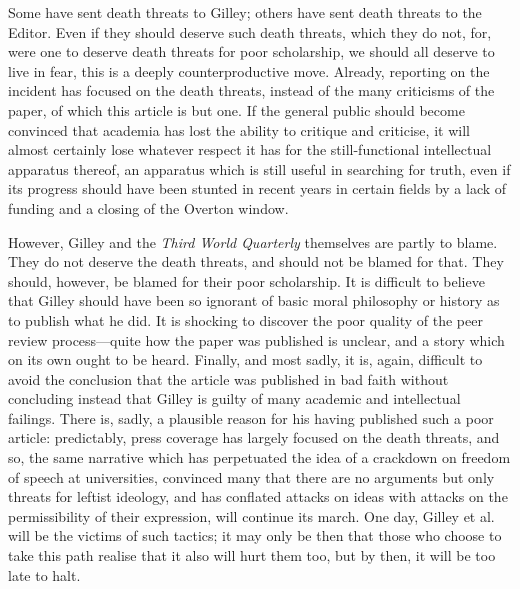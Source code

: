 \begin{multicols}{2}
Some have sent death threats to Gilley; others have sent death threats to the Editor. Even if they should deserve such death threats, which they do not, for, were one to deserve death threats for poor scholarship, we should all deserve to live in fear, this is a deeply counterproductive move. Already, reporting on the incident has focused on the death threats, instead of the many criticisms of the paper, of which this article is but one. If the general public should become convinced that academia has lost the ability to critique and criticise, it will almost certainly lose whatever respect it has for the still-functional intellectual apparatus thereof, an apparatus which is still useful in searching for truth, even if its progress should have been stunted in recent years in certain fields by a lack of funding and a closing of the Overton window. 

However, Gilley and the \textit{Third World Quarterly} themselves are partly to blame. They do not deserve the death threats, and should not be blamed for that. They should, however, be blamed for their poor scholarship. It is difficult to believe that Gilley should have been so ignorant of basic moral philosophy or history as to publish what he did. It is shocking to discover the poor quality of the peer review process---quite how the paper was published is unclear, and a story which on its own ought to be heard. Finally, and most sadly, it is, again, difficult to avoid the conclusion that the article was published in bad faith without concluding instead that Gilley is guilty of many academic and intellectual failings. There is, sadly, a plausible reason for his having published such a poor article: predictably, press coverage has largely focused on the death threats, and so, the same narrative which has perpetuated the idea of a crackdown on freedom of speech at universities, convinced many that there are no arguments but only threats for leftist ideology, and has conflated attacks on ideas with attacks on the permissibility of their expression, will continue its march. One day, Gilley et al. will be the victims of such tactics; it may only be then that those who choose to take this path realise that it also will hurt them too, but by then, it will be too late to halt. 

\end{multicols}